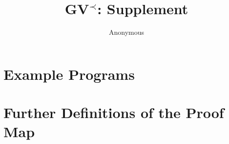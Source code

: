 \documentclass[acmsmall,screen,review,anonymous,nonacm]{acmart}
\def\OurLang{\texorpdfstring{GV\ensuremath{^{\prec}}}{GV-prec}\xspace}
\begin{document}
\title{\OurLang: Supplement}
\author{Anonymous}
\maketitle

\section{Example Programs}
\label{sup:examples}


\section{Further Definitions of the Proof Map}
\label{sup:blocks}

\end{document}

